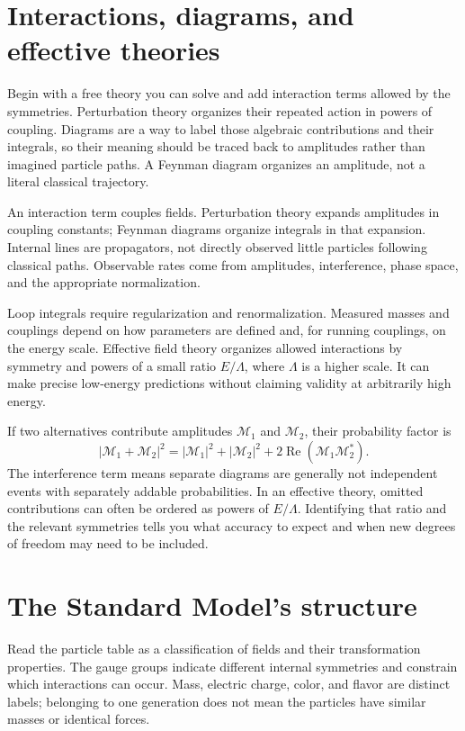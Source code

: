\documentclass[11pt,oneside]{book}
\theoremstyle{reviewstyle}
\begin{document}
\section{Interactions, diagrams, and effective theories}
Begin with a free theory you can solve and add interaction terms allowed by the symmetries. Perturbation theory organizes their repeated action in powers of coupling. Diagrams are a way to label those algebraic contributions and their integrals, so their meaning should be traced back to amplitudes rather than imagined particle paths. A Feynman diagram organizes an amplitude, not a literal classical trajectory.

An interaction term couples fields. Perturbation theory expands amplitudes in coupling constants; Feynman diagrams organize integrals in that expansion. Internal lines are propagators, not directly observed little particles following classical paths. Observable rates come from amplitudes, interference, phase space, and the appropriate normalization.

Loop integrals require regularization and renormalization. Measured masses and couplings depend on how parameters are defined and, for running couplings, on the energy scale. Effective field theory organizes allowed interactions by symmetry and powers of a small ratio $E/\Lambda$, where $\Lambda$ is a higher scale. It can make precise low-energy predictions without claiming validity at arbitrarily high energy.

If two alternatives contribute amplitudes $\mathcal M_1$ and $\mathcal M_2$, their probability factor is
\begin{equation}
|\mathcal M_1+\mathcal M_2|^2
=|\mathcal M_1|^2+|\mathcal M_2|^2
+2\operatorname{Re}(\mathcal M_1\mathcal M_2^*).
\end{equation}
The interference term means separate diagrams are generally not independent events with separately addable probabilities. In an effective theory, omitted contributions can often be ordered as powers of $E/\Lambda$. Identifying that ratio and the relevant symmetries tells you what accuracy to expect and when new degrees of freedom may need to be included.

\section{The Standard Model's structure}
Read the particle table as a classification of fields and their transformation properties. The gauge groups indicate different internal symmetries and constrain which interactions can occur. Mass, electric charge, color, and flavor are distinct labels; belonging to one generation does not mean the particles have similar masses or identical forces.
\end{document}
